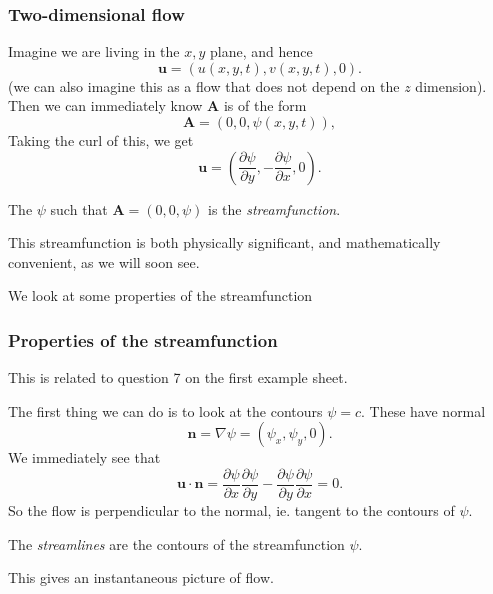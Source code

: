 \documentclass[a4paper]{article}
\begin{document}
\subsubsection{Two-dimensional flow}
Imagine we are living in the $x, y$ plane, and hence
\[
  \mathbf{u} = (u(x, y, t), v(x, y, t), 0).
\]
(we can also imagine this as a flow that does not depend on the $z$ dimension). Then we can immediately know $\mathbf{A}$ is of the form
\[
  \mathbf{A} = (0, 0, \psi(x, y, t)),
\]
Taking the curl of this, we get
\[
  \mathbf{u} = \left(\frac{\partial \psi}{\partial y}, -\frac{\partial \psi}{\partial x}, 0\right).
\]
\begin{defi}[Streamfunction]
  The $\psi$ such that $\mathbf{A} = (0, 0, \psi)$ is the \emph{streamfunction}.
\end{defi}
This streamfunction is both physically significant, and mathematically convenient, as we will soon see.

We look at some properties of the streamfunction
\subsubsection{Properties of the streamfunction}
This is related to question 7 on the first example sheet.

The first thing we can do is to look at the contours $\psi = c$. These have normal
\[
  \mathbf{n} = \nabla \psi = \left(\psi_x, \psi_y, 0\right).
\]
We immediately see that
\[
  \mathbf{u}\cdot \mathbf{n} = \frac{\partial \psi}{\partial x} \frac{\partial \psi}{\partial y} - \frac{\partial \psi}{\partial y}\frac{\partial \psi}{\partial x} = 0.
\]
So the flow is perpendicular to the normal, ie. tangent to the contours of $\psi$.
\begin{defi}[Streamlines]
  The \emph{streamlines} are the contours of the streamfunction $\psi$.
\end{defi}
This gives an instantaneous picture of flow.
\end{document}
